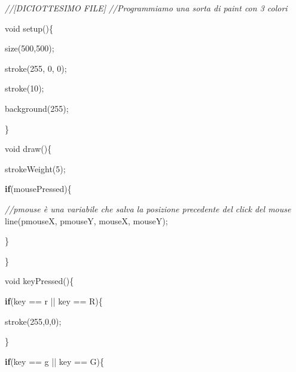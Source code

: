 \documentclass[
]{article}
\newenvironment{Shaded}{}{}
\newcommand{\CharTok}[1]{\textcolor[rgb]{0.25,0.44,0.63}{#1}}
\newcommand{\CommentTok}[1]{\textcolor[rgb]{0.38,0.63,0.69}{\textit{#1}}}
\newcommand{\ControlFlowTok}[1]{\textcolor[rgb]{0.00,0.44,0.13}{\textbf{#1}}}
\newcommand{\DataTypeTok}[1]{\textcolor[rgb]{0.56,0.13,0.00}{#1}}
\newcommand{\DecValTok}[1]{\textcolor[rgb]{0.25,0.63,0.44}{#1}}
\newcommand{\FunctionTok}[1]{\textcolor[rgb]{0.02,0.16,0.49}{#1}}
\newcommand{\NormalTok}[1]{#1}
\newcommand{\OperatorTok}[1]{\textcolor[rgb]{0.40,0.40,0.40}{#1}}
\begin{document}
\begin{Shaded}
\begin{Highlighting}[]
\CommentTok{//[DICIOTTESIMO FILE]
}
\CommentTok{//Programmiamo una sorta di paint con 3 colori
}


\DataTypeTok{void} \FunctionTok{setup}\OperatorTok{()\{}

    \FunctionTok{size}\OperatorTok{(}\DecValTok{500}\OperatorTok{,}\DecValTok{500}\OperatorTok{);}

     \FunctionTok{stroke}\OperatorTok{(}\DecValTok{255}\OperatorTok{,} \DecValTok{0}\OperatorTok{,} \DecValTok{0}\OperatorTok{);}

    \FunctionTok{stroke}\OperatorTok{(}\DecValTok{10}\OperatorTok{);}

    \FunctionTok{background}\OperatorTok{(}\DecValTok{255}\OperatorTok{);}

\OperatorTok{\}}



\DataTypeTok{void} \FunctionTok{draw}\OperatorTok{()\{}

    \FunctionTok{strokeWeight}\OperatorTok{(}\DecValTok{5}\OperatorTok{);}

    \ControlFlowTok{if}\OperatorTok{(}\NormalTok{mousePressed}\OperatorTok{)\{}

        \CommentTok{//pmouse è una variabile che salva la posizione precedente del click del mouse
}
        \FunctionTok{line}\OperatorTok{(}\NormalTok{pmouseX}\OperatorTok{,}\NormalTok{ pmouseY}\OperatorTok{,}\NormalTok{ mouseX}\OperatorTok{,}\NormalTok{ mouseY}\OperatorTok{);}

    \OperatorTok{\}}

\OperatorTok{\}}



\DataTypeTok{void} \FunctionTok{keyPressed}\OperatorTok{()\{}

    \ControlFlowTok{if}\OperatorTok{(}\NormalTok{key }\OperatorTok{==} \CharTok{\textquotesingle{}r\textquotesingle{}} \OperatorTok{||}\NormalTok{ key }\OperatorTok{==} \CharTok{\textquotesingle{}R\textquotesingle{}}\OperatorTok{)\{}

        \FunctionTok{stroke}\OperatorTok{(}\DecValTok{255}\OperatorTok{,}\DecValTok{0}\OperatorTok{,}\DecValTok{0}\OperatorTok{);}

    \OperatorTok{\}}

    \ControlFlowTok{if}\OperatorTok{(}\NormalTok{key }\OperatorTok{==} \CharTok{\textquotesingle{}g\textquotesingle{}} \OperatorTok{||}\NormalTok{ key }\OperatorTok{==} \CharTok{\textquotesingle{}G\textquotesingle{}}\OperatorTok{)\{}


\end{Highlighting}
\end{Shaded}
\end{document}
